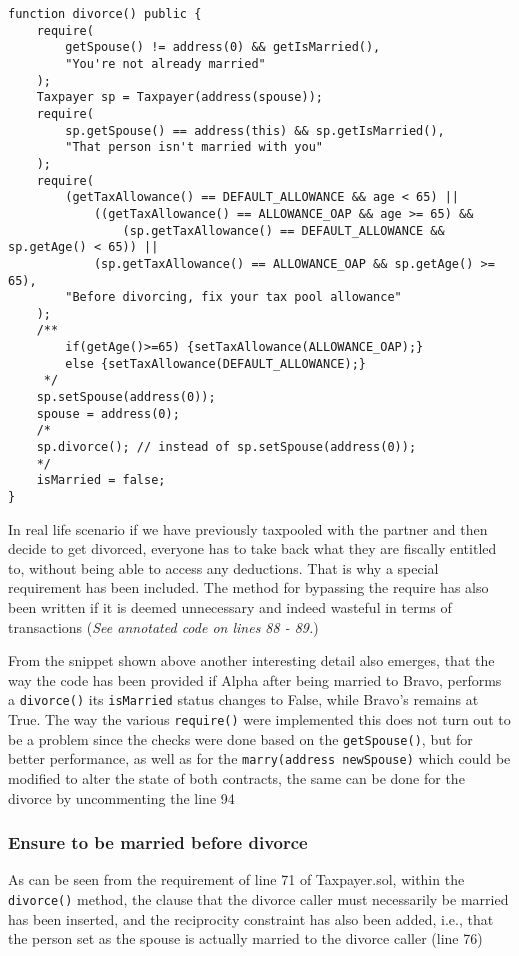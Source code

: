 \documentclass{article}
\begin{document}
\begin{verbatim}
function divorce() public {
    require(
        getSpouse() != address(0) && getIsMarried(),
        "You're not already married"
    );
    Taxpayer sp = Taxpayer(address(spouse));
    require(
        sp.getSpouse() == address(this) && sp.getIsMarried(),
        "That person isn't married with you"
    );
    require(
        (getTaxAllowance() == DEFAULT_ALLOWANCE && age < 65) ||
            ((getTaxAllowance() == ALLOWANCE_OAP && age >= 65) &&
                (sp.getTaxAllowance() == DEFAULT_ALLOWANCE && sp.getAge() < 65)) ||
            (sp.getTaxAllowance() == ALLOWANCE_OAP && sp.getAge() >= 65),
        "Before divorcing, fix your tax pool allowance"
    ); 
    /**
        if(getAge()>=65) {setTaxAllowance(ALLOWANCE_OAP);}
        else {setTaxAllowance(DEFAULT_ALLOWANCE);}
     */
    sp.setSpouse(address(0));
    spouse = address(0);
    /*
    sp.divorce(); // instead of sp.setSpouse(address(0));
    */
    isMarried = false;
}
\end{verbatim}
In real life scenario if we have previously taxpooled with the partner and then decide to get divorced, everyone has to take back what they are fiscally entitled to, without being able to access any deductions. That is why a special requirement has been included. The method for bypassing the require has also been written if it is deemed unnecessary and indeed wasteful in terms of transactions (\textit{See annotated code on lines 88 - 89.})

From the snippet shown above another interesting detail also emerges, that the way the code has been provided if Alpha after being married to Bravo, performs a \texttt{divorce()} its \texttt{isMarried} status changes to False, while Bravo's remains at True. The way the various \texttt{require()} were implemented this does not turn out to be a problem since the checks were done based on the \texttt{getSpouse()}, but for better performance, as well as for the \texttt{marry(address newSpouse)} which could be modified to alter the state of both contracts, the same can be done for the divorce by uncommenting the line 94
\subsubsection{Ensure to be married before divorce}
As can be seen from the requirement of line 71 of Taxpayer.sol, within the \texttt{divorce()} method, the clause that the divorce caller must necessarily be married has been inserted, and the reciprocity constraint has also been added, i.e., that the person set as the spouse is actually married to the divorce caller (line 76)
\end{document}

